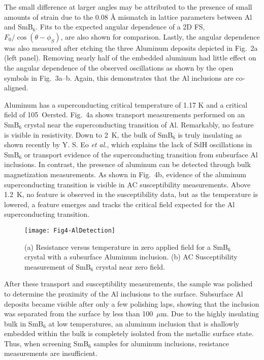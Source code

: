 \documentclass[twocolumn,preprintnumbers,amsmath,amssymb]{revtex4}
\begin{document}
The small difference at larger angles may be attributed to the presence of small amounts of strain due to the 0.08 \AA{} mismatch in lattice parameters between Al and SmB$_6$.
Fits to the expected angular dependence of a 2D FS, $F_0/\cos(\theta-\phi_S)$, are also shown for comparison.
Lastly, the angular dependence was also measured after etching the three Aluminum deposits depicted in Fig.~2a (left panel).
Removing nearly half of the embedded aluminum had little effect on the angular dependence of the observed oscillations as shown by the open symbols in Fig.~3a--b.
Again, this demonstrates that the Al inclusions are co-aligned.


Aluminum has a superconducting critical temperature of 1.17 K and a critical field of 105~Oersted.\cite{Caplan1965}
Fig.~4a shows transport measurements performed on an SmB$_6$ crystal near the superconducting transition of Al.
Remarkably, no feature is visible in resistivity.
Down to 2~K, the bulk of SmB$_6$ is truly insulating as shown recently by Y. S. Eo \textit{et al.},
which explains the lack of SdH oscillations in SmB$_6$ or transport evidence of the superconducting transition from subsurface Al inclusions.\cite{Eo2018}
In contrast, the presence of aluminum can be detected through bulk magnetization measurements.
As shown in Fig.~4b, evidence of the aluminum superconducting transition is visible in AC susceptibility measurements.
Above 1.2~K, no feature is observed in the susceptibility data,
but as the temperature is lowered, a feature emerges and tracks the critical field expected for the Al superconducting transition.


\begin{figure}[]
    \begin{center}
    \texttt{[image: Fig4-AlDetection]}
    \vspace{-0.7cm}
    \end{center}
    \caption{
    (a) Resistance versus temperature in zero applied field for a SmB$_6$ crystal with a subsurface Aluminum inclusion.
    (b) AC Susceptibility measurement of SmB$_6$ crystal near zero field.
    }\label{fig:al_detection}
\end{figure}

After these transport and susceptibility measurements, the sample was polished to determine the proximity of the Al inclusions to the surface.
Subsurface Al deposits became visible after only a few polishing laps, showing that the inclusion was separated from the surface by less than 100~$\mu$m.
Due to the highly insulating bulk in SmB$_{6}$ at low temperatures, an aluminum inclusion that is shallowly embedded within the bulk is completely isolated from the metallic surface state.
Thus, when screening SmB$_6$ samples for aluminum inclusions, resistance measurements are insufficient.
\end{document}
